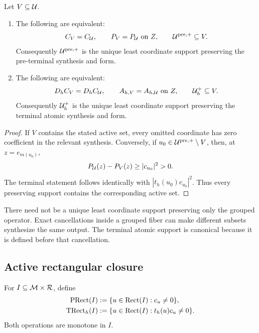 \begin{proposition}
\label{prop:completion-minimal-coordinate-supports}
Let \(V\subseteq\mathcal U\).
\begin{enumerate}[label=\textup{(\roman*)},leftmargin=3em]
 \item The following are equivalent:
       \begin{equation}
        C_V=C_{\mathcal U},
        \qquad
        P_V=P_{\mathcal U}\text{ on }Z,
        \qquad
        \mathcal U^{\mathrm{pre},+}\subseteq V.
        \label{eq:completion-pre-minimal-equivalence}
       \end{equation}
       Consequently \(\mathcal U^{\mathrm{pre},+}\) is the unique least
       coordinate support preserving the pre-terminal synthesis and form.
 \item The following are equivalent:
       \begin{equation}
        D_hC_V=D_hC_{\mathcal U},
        \qquad
        A_{h,V}=A_{h,\mathcal U}\text{ on }Z,
        \qquad
        \mathcal U_h^+\subseteq V.
        \label{eq:completion-terminal-minimal-equivalence}
       \end{equation}
       Consequently \(\mathcal U_h^+\) is the unique least coordinate support
       preserving the terminal atomic synthesis and form.
\end{enumerate}
\end{proposition}

\begin{proof}
If \(V\) contains the stated active set, every omitted coordinate has zero
coefficient in the relevant synthesis.  Conversely, if
\(u_0\in\mathcal U^{\mathrm{pre},+}\setminus V\), then, at
\(z=e_{m(u_0)}\),
\[
 P_{\mathcal U}(z)-P_V(z)\ge |c_{u_0}|^2>0.
\]
The terminal statement follows identically with
\(|t_h(u_0)c_{u_0}|^2\).  Thus every preserving support contains the
corresponding active set.
\end{proof}

There need not be a unique least coordinate support preserving only the
grouped operator.  Exact cancellations inside a grouped fiber can make
different subsets synthesize the same output.  The terminal atomic support
is canonical because it is defined before that cancellation.

\subsection{Active rectangular closure}

For \(I\subseteq\mathcal M\times\mathcal R\), define
\begin{align}
 \operatorname{PRect}(I)
 &:=\{u\in\operatorname{Rect}(I):c_u\ne0\},
 \label{eq:completion-PRect}\\
 \operatorname{TRect}_h(I)
 &:=\{u\in\operatorname{Rect}(I):t_h(u)c_u\ne0\}.
 \label{eq:completion-TRect}
\end{align}
Both operations are monotone in \(I\).

